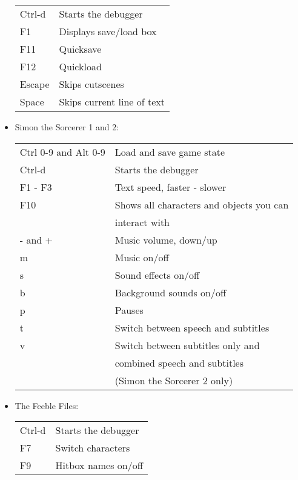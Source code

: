 \begin{itemize}
  \begin{tabular}{ll}
    Ctrl-d                 & Starts the debugger\\
    F1                     & Displays save/load box\\
    F11                    & Quicksave\\
    F12                    & Quickload\\
    Escape                 & Skips cutscenes\\
    Space                  & Skips current line of text\\
  \end{tabular}
\item Simon the Sorcerer 1 and 2:\\
  \begin{tabular}{ll}
    Ctrl 0-9 and Alt 0-9   & Load and save game state\\
    Ctrl-d                 & Starts the debugger\\
    F1 - F3                & Text speed, faster - slower\\
    F10                    & Shows all characters and objects you can \\
                           & interact with\\
    - and +                & Music volume, down/up\\
    m                      & Music on/off\\
    s                      & Sound effects on/off\\
    b                      & Background sounds on/off\\
    p                      & Pauses\\
    t                      & Switch between speech and subtitles\\
    v                      & Switch between subtitles only and\\
                           & combined speech and subtitles\\
                           & (Simon the Sorcerer 2 only)\\
  \end{tabular}
\item The Feeble Files:\\
  \begin{tabular}{ll}
    Ctrl-d                 & Starts the debugger\\
    F7                     & Switch characters\\
    F9                     & Hitbox names on/off\\

\end{tabular}
\end{itemize}
